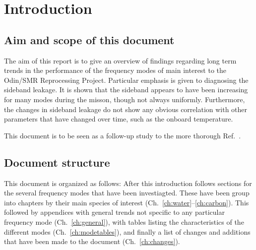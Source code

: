 \chapter{Introduction}
\label{ch:introduction}


\setcounter{page}{1}


\section{Aim and scope of this document}
\label{sec:aim}
The aim of this report is to give an overview of findings regarding long term
trends in the performance of the frequency modes of main interest to the
Odin/SMR Reprocessing Project.  Particular emphasis is given to diagnosing the
sideband leakage.  It is shown that the sideband appears to have been
increasing for many modes during the misson, though not always uniformly.
Furthermore, the changes in sideband leakage do not show any obvious
correlation with other parameters that have changed over time, such as the
onboard temperature.

This document is to be seen as a follow-up study to the more thorough
Ref.~\cite{postlaunch:2006}.

\section{Document structure}
\label{sec:structure}
This document is organized as follows:  After this introduction follows
sections for the several frequency modes that have been investiagted.  These
have been group into chapters by their main species of interest
(Ch.~\ref{ch:water}--\ref{ch:carbon}).  This followed by appendices with general
trends not specific to any particular frequency mode (Ch.~\ref{ch:general}),
with tables listing the characteristics of the different modes
(Ch.~\ref{ch:modetables}), and finally a list of changes and additions that
have been made to the document (Ch.~\ref{ch:changes}).
